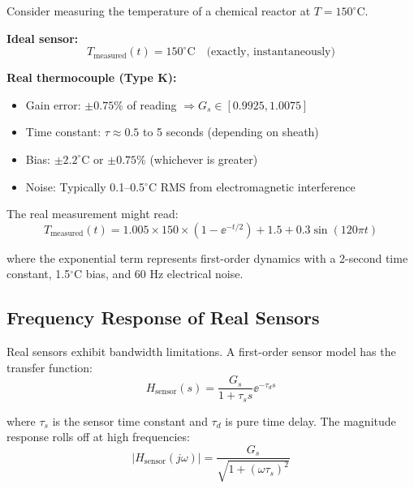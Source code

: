 \begin{examplebox}[title=Example 2.1: Temperature Sensor Comparison]
Consider measuring the temperature of a chemical reactor at $T = 150^\circ$C.

\textbf{Ideal sensor:}
\begin{equation}
T_{\text{measured}}(t) = 150^\circ\text{C} \quad \text{(exactly, instantaneously)}
\end{equation}

\textbf{Real thermocouple (Type K):}
\begin{itemize}
    \item Gain error: $\pm 0.75\%$ of reading $\Rightarrow G_s \in [0.9925, 1.0075]$
    \item Time constant: $\tau \approx 0.5$ to 5 seconds (depending on sheath)
    \item Bias: $\pm 2.2^\circ$C or $\pm 0.75\%$ (whichever is greater)
    \item Noise: Typically 0.1--0.5$^\circ$C RMS from electromagnetic interference
\end{itemize}

The real measurement might read:
\begin{equation}
T_{\text{measured}}(t) = 1.005 \times 150 \times (1 - \ee^{-t/2}) + 1.5 + 0.3\sin(120\pi t)
\end{equation}

where the exponential term represents first-order dynamics with a 2-second time constant, 1.5$^\circ$C bias, and 60 Hz electrical noise.
\end{examplebox}

\subsection{Frequency Response of Real Sensors}

Real sensors exhibit bandwidth limitations. A first-order sensor model has the transfer function:
\begin{equation}
H_{\text{sensor}}(s) = \frac{G_s}{1 + \tau_s s} \ee^{-\tau_d s}
\label{eq:first_order_sensor}
\end{equation}

where $\tau_s$ is the sensor time constant and $\tau_d$ is pure time delay. The magnitude response rolls off at high frequencies:
\begin{equation}
|H_{\text{sensor}}(j\omega)| = \frac{G_s}{\sqrt{1 + (\omega\tau_s)^2}}
\end{equation}

